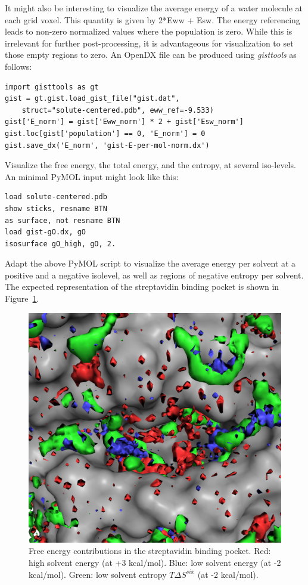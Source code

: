 \documentclass[9pt,tutorial]{livecoms}
\newcommand{\software}{\emph}
\begin{document}
It might also be interesting to visualize the average energy of a water molecule at each grid voxel.
This quantity is given by 2*Eww + Esw.
The energy referencing leads to non-zero normalized values where the population is zero.
While this is irrelevant for further post-processing, it is advantageous for visualization to set those empty regions to zero.
An OpenDX file can be produced using \software{gisttools} as follows:

\begin{lstlisting}[style=python]
import gisttools as gt
gist = gt.gist.load_gist_file("gist.dat",
    struct="solute-centered.pdb", eww_ref=-9.533)
gist['E_norm'] = gist['Eww_norm'] * 2 + gist['Esw_norm']
gist.loc[gist['population'] == 0, 'E_norm'] = 0
gist.save_dx('E_norm', 'gist-E-per-mol-norm.dx')
\end{lstlisting}

Visualize the free energy, the total energy, and the entropy, at several iso-levels.
An minimal PyMOL input might look like this:

\begin{lstlisting}
load solute-centered.pdb
show sticks, resname BTN
as surface, not resname BTN
load gist-gO.dx, gO
isosurface gO_high, gO, 2.
\end{lstlisting}

Adapt the above PyMOL script to visualize the average energy per solvent at a positive and a negative isolevel, as well as regions of negative entropy per solvent.
The expected representation of the streptavidin binding pocket is shown in Figure~\ref{fig_binding_pocket_pymol}.

\begin{figure}
	\centering
	\includegraphics[width=0.8\linewidth]{figures/binding_pocket_S_-2_E_-2_E_3.png}
	\caption{Free energy contributions in the streptavidin binding pocket. Red: high solvent energy (at +3 kcal/mol). Blue: low solvent energy (at -2 kcal/mol). Green: low solvent entropy $T\Delta S^{six}$ (at -2 kcal/mol).}\label{fig_binding_pocket_pymol}
\end{figure}
\end{document}

